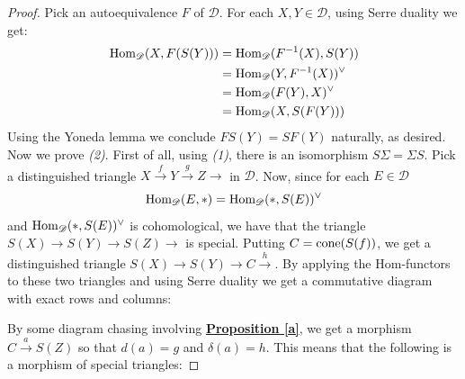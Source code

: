 \begin{proof}
Pick an autoequivalence $F$ of $\mathscr{D}$. For each $X, Y \in \mathscr{D}$, using Serre duality we get: 
\begin{align*}
\textnormal{Hom}_{\mathscr{D}}(X,F(S(Y))) & =   \textnormal{Hom}_{\mathscr{D}}(F^{-1}(X),S(Y)) \\
 & =  \textnormal{Hom}_{\mathscr{D}}(Y,F^{-1}(X))^{\vee} \\
& = \textnormal{Hom}_{\mathscr{D}}(F(Y),X)^{\vee} \\
& =  \textnormal{Hom}_{\mathscr{D}}(X,S(F(Y)))
\end{align*}
Using the Yoneda lemma we conclude $FS(Y)=SF(Y)$ naturally, as desired. \\
Now we prove \textit{(2)}. First of all, using \textit{(1)}, there is an isomorphism $S \Sigma = \Sigma S$. Pick a distinguished triangle $X \overset{f}{\longrightarrow} Y \overset{g}{\longrightarrow} Z \longrightarrow $ in $\mathscr{D}$. Now, since for each $E \in \mathscr{D}$ $$\textnormal{Hom}_{\mathscr{D}}(E,*)=\textnormal{Hom}_{\mathscr{D}}(*,S(E))^{\vee}$$ 
and $\textnormal{Hom}_{\mathscr{D}}(*,S(E))^{\vee}$ is cohomological, we have that the triangle $S(X) \longrightarrow S(Y) \longrightarrow S(Z) \longrightarrow$ is special. Putting $C=\textnormal{cone}(S(f))$, we get a distinguished triangle $S(X) \longrightarrow S(Y) \longrightarrow C \overset{h}{\longrightarrow}$. By applying the Hom-functors to these two triangles and using Serre duality we get a commutative diagram with exact rows and columns: 
\begin{center}
\end{center}
By some diagram chasing involving  \hyperref[a]{\textbf{Proposition \ref*{a}}}, we get a morphism $C \overset{a}{\longrightarrow} S(Z)$ so that $d(a)=g$ and $\delta(a)=h$. This means that the following is a morphism of special triangles: 

\end{proof}
